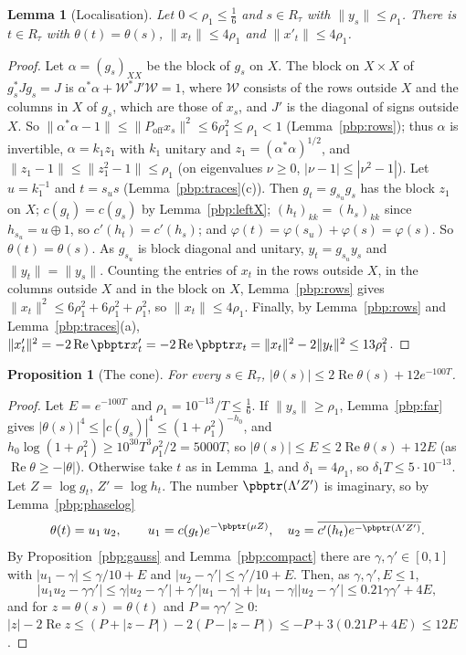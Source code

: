 \documentclass[10pt]{amsart}
\newtheorem{proposition}[theorem]{Proposition}
\newtheorem{lemma}[theorem]{Lemma}
\theoremstyle{definition}
\theoremstyle{remark}
\newcommand{\Rel}{\operatorname{Re}}
\providecommand{\aubar}[1]{\overline{#1}}
\begin{document}
\begin{lemma}[Localisation]\label{pbp:localise}
Let $0<\rho_1\le\frac16$ and $s\in R_\tau$ with $\|y_s\|\le\rho_1$. There is $t\in R_\tau$ with
$\theta(t)=\theta(s)$, $\|x_t\|\le4\rho_1$ and $\|x'_t\|\le4\rho_1$.
\end{lemma}
\begin{proof}
Let $\alpha=(g_s)_{XX}$ be the block of $g_s$ on $X$. The block on $X\times X$ of $g_s^*Jg_s=J$ is
$\alpha^*\alpha+\mathcal W^*J'\mathcal W=1$, where $\mathcal W$ consists of the rows outside $X$ and the
columns in $X$ of $g_s$, which are those of $x_s$, and $J'$ is the diagonal of signs outside $X$. So
$\|\alpha^*\alpha-1\|\le\|P_{\mathrm{off}}x_s\|^2\le6\rho_1^2\le\rho_1<1$ (Lemma~\ref{pbp:rows}); thus
$\alpha$ is invertible, $\alpha=k_1z_1$ with $k_1$ unitary and $z_1=(\alpha^*\alpha)^{1/2}$, and $\|z_1-1\|
\le\|z_1^2-1\|\le\rho_1$ (on eigenvalues $\nu\ge0$, $|\nu-1|\le|\nu^2-1|$). Let $u=k_1^{-1}$ and $t=s_us$
(Lemma~\ref{pbp:traces}(c)). Then $g_t=g_{s_u}g_s$ has the block $z_1$ on $X$; $c(g_t)=c(g_s)$ by
Lemma~\ref{pbp:leftX}; $(h_t)_{kk}=(h_s)_{kk}$ since $h_{s_u}=u\oplus1$, so $c'(h_t)=c'(h_s)$; and
$\varphi(t)=\varphi(s_u)+\varphi(s)=\varphi(s)$. So $\theta(t)=\theta(s)$. As $g_{s_u}$ is block diagonal and
unitary, $y_t=g_{s_u}y_s$ and $\|y_t\|=\|y_s\|$. Counting the entries of $x_t$ in the rows outside
$X$, in the columns outside $X$ and in the block on $X$, Lemma~\ref{pbp:rows} gives $\|x_t\|^2\le
6\rho_1^2+6\rho_1^2+\rho_1^2$, so $\|x_t\|\le4\rho_1$. Finally, by Lemma~\ref{pbp:rows} and
Lemma~\ref{pbp:traces}(a), $\|x'_t\|^2=-2\Rel\pbptr x'_t=-2\Rel\pbptr x_t=\|x_t\|^2-2\|y_t\|^2\le13\rho_1^2$.
\end{proof}

\begin{proposition}[The cone]\label{pbp:cone}
For every $s\in R_\tau$, $|\theta(s)|\le2\Rel\theta(s)+12e^{-100T}$.
\end{proposition}
\begin{proof}
Let $E=e^{-100T}$ and $\rho_1=10^{-13}/T\le\frac16$. If $\|y_s\|\ge\rho_1$, Lemma~\ref{pbp:far} gives
$|\theta(s)|^4\le|c(g_s)|^4\le(1+\rho_1^2)^{-h_0}$, and $h_0\log(1+\rho_1^2)\ge10^{30}T^3\rho_1^2/2=5000T$,
so $|\theta(s)|\le E\le2\Rel\theta(s)+12E$ (as $\Rel\theta\ge-|\theta|$). Otherwise take $t$ as in
Lemma~\ref{pbp:localise}, and $\delta_1=4\rho_1$, so $\delta_1T\le5\cdot10^{-13}$. Let $Z=\log g_t$,
$Z'=\log h_t$. The number $\pbptr(\Lambda'Z')$ is imaginary, so by Lemma~\ref{pbp:phaselog}
\[
\theta(t)=u_1\,u_2,\qquad u_1=c(g_t)e^{-\pbptr(\mu Z)},\quad u_2=\aubar{c'(h_t)e^{-\pbptr(\Lambda'Z')}} .
\]
By Proposition~\ref{pbp:gauss} and Lemma~\ref{pbp:compact} there are $\gamma,\gamma'\in[0,1]$ with
$|u_1-\gamma|\le\gamma/10+E$ and $|u_2-\gamma'|\le\gamma'/10+E$. Then, as $\gamma,\gamma',E\le1$,
\[
|u_1u_2-\gamma\gamma'|\le\gamma|u_2-\gamma'|+\gamma'|u_1-\gamma|+|u_1-\gamma||u_2-\gamma'|\le
0.21\gamma\gamma'+4E ,
\]
and for $z=\theta(s)=\theta(t)$ and $P=\gamma\gamma'\ge0$: $|z|-2\Rel z\le(P+|z-P|)-2(P-|z-P|)\le
-P+3(0.21P+4E)\le12E$.
\end{proof}
\end{document}
